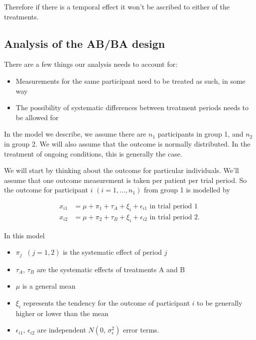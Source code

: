 \documentclass[
  openany]{book}
\providecommand{\tightlist}{%
  \setlength{\itemsep}{0pt}\setlength{\parskip}{0pt}}
\theoremstyle{definition}
\theoremstyle{definition}
\theoremstyle{definition}
\theoremstyle{definition}
\theoremstyle{remark}
\begin{document}
Therefore if there is a temporal effect it won't be ascribed to either of the treatments.

\subsection{Analysis of the AB/BA design}\label{analysis-of-the-abba-design}

There are a few things our analysis needs to account for:

\begin{itemize}
\tightlist
\item
  Measurements for the same participant need to be treated as such, in some way
\item
  The possibility of systematic differences between treatment periods needs to be allowed for
\end{itemize}

In the model we describe, we assume there are \(n_1\) participants in group 1, and \(n_2\) in group 2. We will also assume that the outcome is normally distributed. In the treatment of ongoing conditions, this is generally the case.

We will start by thinking about the outcome for particular individuals. We'll assume that one outcome measurement is taken per patient per trial period. So the outcome for participant \(i\) \((i = 1,\ldots,n_1)\) from group 1 is modelled by

\begin{align*}
x_{i1} & = \mu + \pi_1 + \tau_A + \xi_i + \epsilon_{i1} \text{ in trial period 1}\\
x_{i2} & = \mu + \pi_2 + \tau_B + \xi_i + \epsilon_{i2} \text{ in trial period 2.}
\end{align*}

In this model

\begin{itemize}
\tightlist
\item
  \(\pi_j\;\;(j=1,2)\) is the systematic effect of period \(j\)
\item
  \(\tau_A,\,\tau_B\) are the systematic effects of treatments A and B
\item
  \(\mu\) is a general mean
\item
  \(\xi_i\) represents the tendency for the outcome of participant \(i\) to be generally higher or lower than the mean
\item
  \(\epsilon_{i1},\,\epsilon_{i2}\) are independent \(N\left(0,\,\sigma_{\epsilon}^2\right)\) error terms.
\end{itemize}
\end{document}
